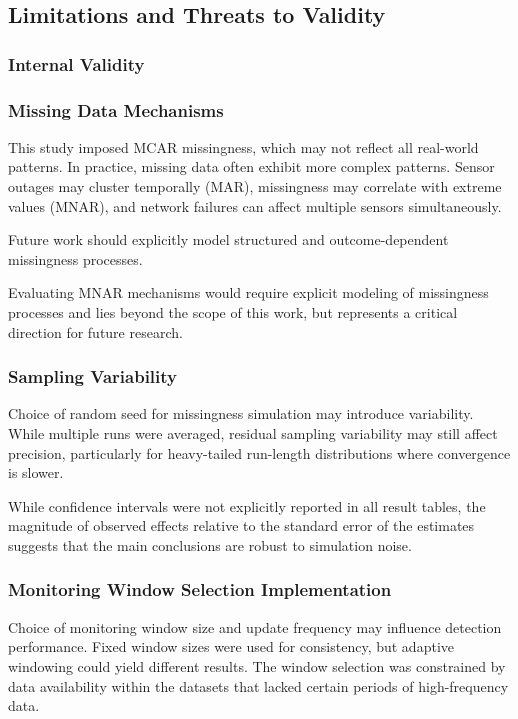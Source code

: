 \subsection{Limitations and Threats to Validity}

\subsubsection{Internal Validity}

\subsubsection{Missing Data Mechanisms}

This study imposed \ac{MCAR} missingness, which may not reflect all real-world patterns. In practice, missing data often exhibit more complex patterns. Sensor outages may cluster temporally (\ac{MAR}), missingness may correlate with extreme values (\ac{MNAR}), and network failures can affect multiple sensors simultaneously.

Future work should explicitly model structured and outcome-dependent missingness processes.

Evaluating MNAR mechanisms would require explicit modeling of missingness processes and lies beyond the scope of this work, but represents a critical direction for future research.

\subsubsection{Sampling Variability}

Choice of random seed for missingness simulation may introduce variability. While multiple runs were averaged, residual sampling variability may still affect precision, particularly for heavy-tailed run-length distributions where convergence is slower.

While confidence intervals were not explicitly reported in all result tables, the magnitude of observed effects relative to the standard error of the estimates suggests that the main conclusions are robust to simulation noise.

\subsubsection{Monitoring Window Selection Implementation}

Choice of monitoring window size and update frequency may influence detection performance. Fixed window sizes were used for consistency, but adaptive windowing could yield different results. The window selection was constrained by data availability within the datasets that lacked certain periods of high-frequency data.


